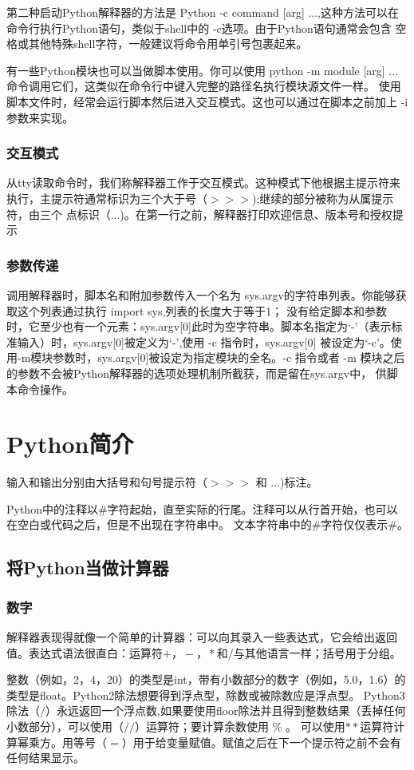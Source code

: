 \documentclass[UTF8]{ctexart}
\begin{document}
第二种启动Python解释器的方法是 Python -c command [arg] ...,这种方法可以在命令行执行Python语句，类似于shell中的 -c选项。由于Python语句通常会包含
空格或其他特殊shell字符，一般建议将命令用单引号包裹起来。

有一些Python模块也可以当做脚本使用。你可以使用 python -m module [arg] ... 命令调用它们，这类似在命令行中键入完整的路径名执行模块源文件一样。
使用脚本文件时，经常会运行脚本然后进入交互模式。这也可以通过在脚本之前加上 -i参数来实现。
\subsubsection{交互模式}
从tty读取命令时，我们称解释器工作于交互模式。这种模式下他根据主提示符来执行，主提示符通常标识为三个大于号（$>>>$);继续的部分被称为从属提示符，由三个
点标识（...)。在第一行之前，解释器打印欢迎信息、版本号和授权提示
\subsubsection{参数传递}
调用解释器时，脚本名和附加参数传入一个名为 sys.argv的字符串列表。你能够获取这个列表通过执行 import sys,列表的长度大于等于1；
没有给定脚本和参数时，它至少也有一个元素：sys.argv[0]此时为空字符串。脚本名指定为`-'（表示标准输入）时，sys.argv[0]被定义为`-',使用 -c 指令时，sys.argv[0]
被设定为`-c'。使用-m模块参数时，sys.argv[0]被设定为指定模块的全名。-c 指令或者 -m 模块之后的参数不会被Python解释器的选项处理机制所截获，而是留在sys.argv中，
供脚本命令操作。
\section{Python简介}
输入和输出分别由大括号和句号提示符（$>>>$ 和 ...)标注。

Python中的注释以\#字符起始，直至实际的行尾。注释可以从行首开始，也可以在空白或代码之后，但是不出现在字符串中。
文本字符串中的\#字符仅仅表示\#。
\subsection{将Python当做计算器}
\subsubsection{数字}
解释器表现得就像一个简单的计算器：可以向其录入一些表达式，它会给出返回值。表达式语法很直白：运算符$+，-，*$和$/$与其他语言一样；括号用于分组。

整数（例如，2，4，20）的类型是int，带有小数部分的数字（例如，5.0，1.6）的类型是float。Python2除法想要得到浮点型，除数或被除数应是浮点型。
Python3除法（$/$）永远返回一个浮点数,如果要使用floor除法并且得到整数结果（丢掉任何小数部分），可以使用（$//$）运算符；要计算余数使用 \% 。
可以使用$**$运算符计算幂乘方。用等号（$=$）用于给变量赋值。赋值之后在下一个提示符之前不会有任何结果显示。
\end{document}
